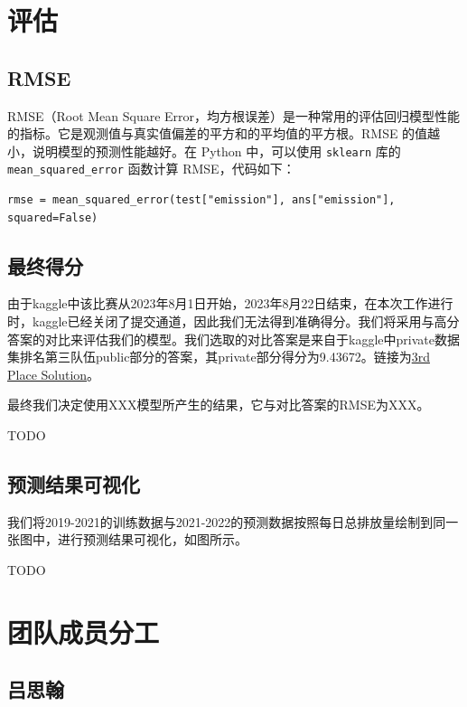 \documentclass{ctexart}
\begin{document}
\section{评估}

\subsection{RMSE}


RMSE（Root Mean Square Error，均方根误差）是一种常用的评估回归模型性能的指标。它是观测值与真实值偏差的平方和的平均值的平方根。RMSE 的值越小，说明模型的预测性能越好。在 Python 中，可以使用 \texttt{sklearn} 库的 \texttt{mean\_squared\_error} 函数计算 RMSE，代码如下：

\begin{lstlisting}[style=Python]
      rmse = mean_squared_error(test["emission"], ans["emission"], squared=False)
\end{lstlisting}

\subsection{最终得分}

由于kaggle中该比赛从2023年8月1日开始，2023年8月22日结束，在本次工作进行时，kaggle已经关闭了提交通道，因此我们无法得到准确得分。我们将采用与高分答案的对比来评估我们的模型。我们选取的对比答案是来自于kaggle中private数据集排名第三队伍public部分的答案，其private部分得分为9.43672。链接为\href{https://www.kaggle.com/competitions/playground-series-s3e20/discussion/433822}{3rd Place Solution}。

最终我们决定使用XXX模型所产生的结果，它与对比答案的RMSE为XXX。

TODO

\subsection{预测结果可视化}

我们将2019-2021的训练数据与2021-2022的预测数据按照每日总排放量绘制到同一张图中，进行预测结果可视化，如图所示。

TODO

\section{团队成员分工}

\subsection{吕思翰}
\end{document}
